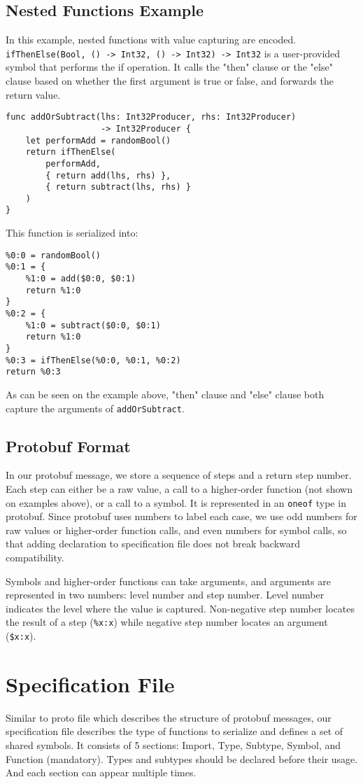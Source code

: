 \documentclass[12pt]{article}
\begin{document}
\subsection{Nested Functions Example}
In this example, nested functions with value capturing are encoded. \texttt{ifThenElse(Bool, () -> Int32, () -> Int32) -> Int32} is a user-provided symbol that performs the if operation. It calls the "then" clause or the "else" clause based on whether the first argument is true or false, and forwards the return value.
\begin{lstlisting}
func addOrSubtract(lhs: Int32Producer, rhs: Int32Producer)
                   -> Int32Producer {
    let performAdd = randomBool()
    return ifThenElse(
        performAdd,
        { return add(lhs, rhs) },
        { return subtract(lhs, rhs) }
    )
}
\end{lstlisting}
This function is serialized into:
\begin{lstlisting}
%0:0 = randomBool()
%0:1 = {
    %1:0 = add($0:0, $0:1)
    return %1:0
}
%0:2 = {
    %1:0 = subtract($0:0, $0:1)
    return %1:0
}
%0:3 = ifThenElse(%0:0, %0:1, %0:2)
return %0:3
\end{lstlisting}
As can be seen on the example above, "then" clause and "else" clause both capture the arguments of \texttt{addOrSubtract}.

\subsection{Protobuf Format}
In our protobuf message, we store a sequence of steps and a return step number. Each step can either be a raw value, a call to a higher-order function (not shown on examples above), or a call to a symbol. It is represented in an \texttt{oneof} type in protobuf. Since protobuf uses numbers to label each case, we use odd numbers for raw values or higher-order function calls, and even numbers for symbol calls, so that adding declaration to specification file does not break backward compatibility.

Symbols and higher-order functions can take arguments, and arguments are represented in two numbers: level number and step number. Level number indicates the level where the value is captured. Non-negative step number locates the result of a step (\texttt{\%x:x}) while negative step number locates an argument (\texttt{\$x:x}).

\section{Specification File}
Similar to proto file which describes the structure of protobuf messages, our specification file describes the type of functions to serialize and defines a set of shared symbols. It consists of 5 sections: Import, Type, Subtype, Symbol, and Function (mandatory). Types and subtypes should be declared before their usage. And each section can appear multiple times.
\end{document}
